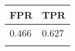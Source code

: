 \begin{tabular}{ll}
\hline
 FPR   & TPR   \\
\hline
 0.466 & 0.627 \\
       &       \\
\hline
\end{tabular}